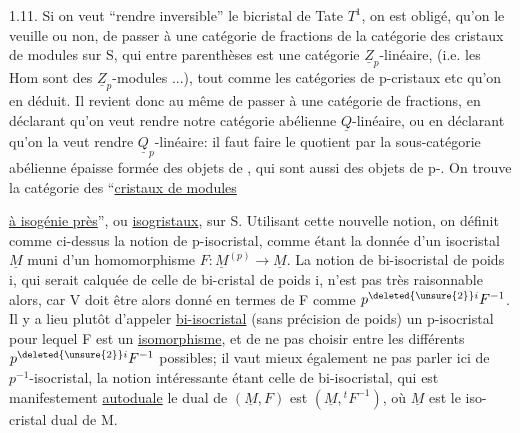 1.11. Si on veut ``rendre inversible'' le bicristal de Tate $T^1$, on est obligé, qu'on le veuille ou non, de passer à une catégorie de fractions de la catégorie des cristaux de modules sur S, \inserted{[}qui entre parenthèses est une catégorie $\underline Z_p$-linéaire, (i.e. les Hom sont des $\underline Z_p$-modules ...), tout comme les catégories de p-cristaux etc qu'on en déduit\inserted{]}. Il revient donc au même de passer à une catégorie de fractions, en déclarant qu'on veut rendre notre catégorie abélienne $\underline Q$-linéaire, ou en déclarant qu'on la veut rendre $\underline Q_p$-linéaire: il faut faire le quotient par la sous-catégorie abélienne épaisse formée des objets de , qui sont aussi des objets de p-. On trouve la catégorie des ``\uline{cristaux de modules}



\uline{à isogénie près}'', ou \uline{isogristaux}, sur S. Utilisant cette nouvelle notion, on définit comme ci-dessus la notion de p-isocristal, comme étant la donnée d'un isocristal $\underline M$ muni d'un homomorphisme $F:\underline M^{(p)}\longrightarrow\underline M$. La notion de bi-isocristal de poids i, qui serait calquée de celle de bi-cristal de poids i, n'est pas très raisonnable alors, car V doit être alors donné en termes de F comme $p^{\deleted{\unsure{2}}i}F^{-1}$. Il y a lieu plutôt d'appeler \uline{bi-isocristal} (sans précision de poids) un p-isocristal pour lequel F est un \uline{isomorphisme}, et de ne pas choisir entre les différents $p^{\deleted{\unsure{2}}i}F^{-1}$ possibles; il vaut mieux également ne pas parler ici de $p^{-1}$-isocristal, la notion intéressante étant celle de bi-isocristal, qui est manifestement \uline{autoduale}   le dual de $(\underline M,F)$ est $(\underline M,{}^tF^{-1})$, où $\underline M$ est le iso-cristal dual de M.

